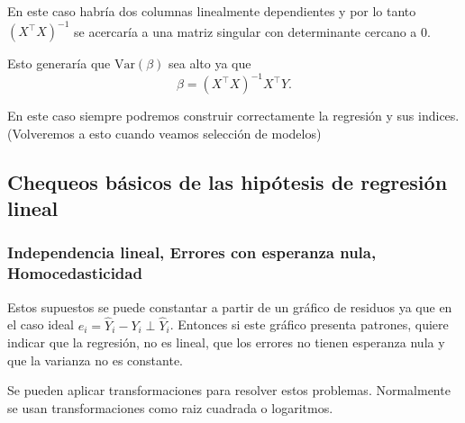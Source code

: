 \documentclass[
  12pt,
]{book}
\providecommand{\tightlist}{%
  \setlength{\itemsep}{0pt}\setlength{\parskip}{0pt}}
\theoremstyle{definition}
\theoremstyle{definition}
\theoremstyle{definition}
\theoremstyle{remark}
\begin{document}
En este caso habría dos columnas linealmente dependientes y por lo tanto \((X^{\top}X)^{-1}\) se acercaría a una matriz singular con determinante cercano a 0.

Esto generaría que \(\mathrm{Var}\left(\beta\right)\) sea alto ya que
\begin{equation*}
\beta =  (X^{\top}X)^{-1} X^{\top}Y.
\end{equation*}

\begin{description}
\tightlist
\item[Más observaciones que predictores]
En este caso siempre podremos construir correctamente la regresión y sus indices. (Volveremos a esto cuando veamos selección de modelos)
\end{description}

\hypertarget{chequeos-buxe1sicos-de-las-hipuxf3tesis-de-regresiuxf3n-lineal}{%
\subsection{Chequeos básicos de las hipótesis de regresión lineal}\label{chequeos-buxe1sicos-de-las-hipuxf3tesis-de-regresiuxf3n-lineal}}

\hypertarget{independencia-lineal-errores-con-esperanza-nula-homocedasticidad}{%
\subsubsection{Independencia lineal, Errores con esperanza nula, Homocedasticidad}\label{independencia-lineal-errores-con-esperanza-nula-homocedasticidad}}

Estos supuestos se puede constantar a partir de un gráfico de residuos ya que en el caso ideal \(e_{i} = \hat{Y}_{i}- Y_{i} \perp \hat{Y}_{i}\). Entonces si este gráfico presenta patrones, quiere indicar que la regresión, no es lineal, que los errores no tienen esperanza nula y que la varianza no es constante.

Se pueden aplicar transformaciones para resolver estos problemas. Normalmente se usan transformaciones como raiz cuadrada o logaritmos.
\end{document}
